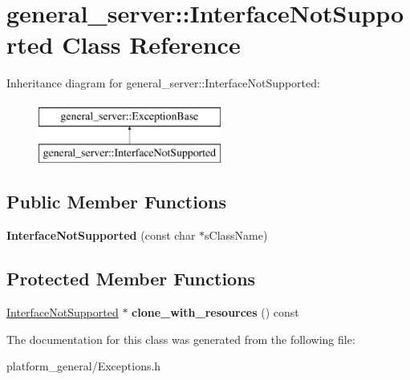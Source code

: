 \hypertarget{classgeneral__server_1_1InterfaceNotSupported}{\section{general\-\_\-server\-:\-:\-Interface\-Not\-Supported \-Class \-Reference}
\label{classgeneral__server_1_1InterfaceNotSupported}
}
\-Inheritance diagram for general\-\_\-server\-:\-:\-Interface\-Not\-Supported\-:\begin{figure}[H]
\begin{center}
\leavevmode
\includegraphics[height=2.000000cm]{classgeneral__server_1_1InterfaceNotSupported}
\end{center}
\end{figure}
\subsection*{\-Public \-Member \-Functions}
\begin{DoxyCompactItemize}
\item 
\hypertarget{classgeneral__server_1_1InterfaceNotSupported_a79a26b93e7d365fb89278db597544283}{{\bfseries \-Interface\-Not\-Supported} (const char $\ast$s\-Class\-Name)}\label{classgeneral__server_1_1InterfaceNotSupported_a79a26b93e7d365fb89278db597544283}

\end{DoxyCompactItemize}
\subsection*{\-Protected \-Member \-Functions}
\begin{DoxyCompactItemize}
\item 
\hypertarget{classgeneral__server_1_1InterfaceNotSupported_a42c8d7b34b8c90c2515717f5a14f38f8}{\hyperlink{classgeneral__server_1_1InterfaceNotSupported}{\-Interface\-Not\-Supported} $\ast$ {\bfseries clone\-\_\-with\-\_\-resources} () const }\label{classgeneral__server_1_1InterfaceNotSupported_a42c8d7b34b8c90c2515717f5a14f38f8}

\end{DoxyCompactItemize}


\-The documentation for this class was generated from the following file\-:\begin{DoxyCompactItemize}
\item 
platform\-\_\-general/\-Exceptions.\-h\end{DoxyCompactItemize}
